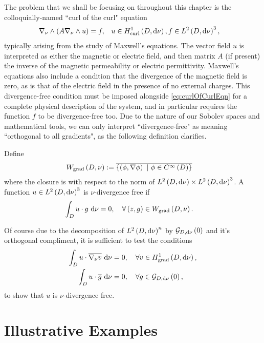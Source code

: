 The problem that we shall be focusing on throughout this chapter is the colloquially-named ``curl of the curl" equation 
\begin{align} \label{eq:curlOfCurlEqn}
	\nabla_{\nu}\wedge\left( A\nabla_{\nu}\wedge u \right) = f, &\quad u\in H^1_\mathrm{curl}\left( D, \mathrm{d}\nu \right), f\in L^{2}\left( D,\mathrm{d}\nu \right)^3,
\end{align}
typically arising from the study of Maxwell's equations.
The vector field $u$ is interpreted as either the magnetic or electric field, and then matrix $A$ (if present) the inverse of the magnetic permeability or electric permittivity.
Maxwell's equations also include a condition that the divergence of the magnetic field is zero, as is that of the electric field in the presence of no external charges.
This divergence-free condition must be imposed alongside \eqref{eq:curlOfCurlEqn} for a complete physical description of the system, and in particular requires the function $f$ to be divergence-free too.
Due to the nature of our Sobolev spaces and mathematical tools, we can only interpret ``divergence-free" as meaning ``orthogonal to all gradients", as the following definition clarifies.
\begin{definition}
	Define 
	\begin{align*}
		W_{\mathrm{grad}}\left( D,\nu \right) &:= \overline{\left\{  \left( \phi, \nabla\phi \right) \ \vert \ \phi\in C^{\infty}\left( D \right)  \right\}}
	\end{align*}
	where the closure is with respect to the norm of $L^{2}\left( D,\mathrm{d}\nu \right)\times L^{2}\left( D,\mathrm{d}\nu \right)^3$.
	A function $u\in L^{2}\left( D,\mathrm{d}\nu \right)^3$ is $\nu$-divergence free if
	\begin{align*}
		\int_{D} u\cdot g  \ \mathrm{d}\nu &= 0, \quad \forall \left( z,g \right)\in W_{\mathrm{grad}}\left( D,\nu \right).
	\end{align*}	 
\end{definition}

Of course due to the decomposition of $L^{2}\left( D,\mathrm{d}\nu \right)^n$ by $\mathcal{G}_{ D, \mathrm{d}\nu}\left( 0 \right)$ and it's orthogonal compliment, it is sufficient to test the conditions
\begin{align*}
	\int_{D} u\cdot\overline{\nabla_{\nu}v}  \ \mathrm{d}\nu &= 0, \quad \forall v\in H^1_\mathrm{grad}\left( D, \mathrm{d}\nu \right), \\
	\int_{D} u\cdot\overline{g}  \ \mathrm{d}\nu &= 0, \quad \forall g\in\mathcal{G}_{ D, \mathrm{d}\nu}\left( 0 \right),
\end{align*}
to show that $u$ is $\nu$-divergence free.

\section{Illustrative Examples} \label{sec:CurlExamples}

